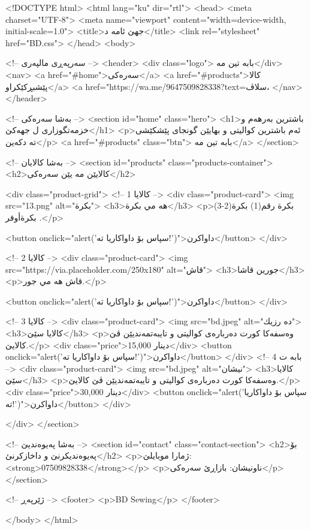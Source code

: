 <!DOCTYPE html>
<html lang="ku" dir="rtl">
<head>
    <meta charset="UTF-8">
    <meta name="viewport" content="width=device-width, initial-scale=1.0">
    <title>جهێ ئامه د</title>
    <link rel="stylesheet" href="BD.css">
</head>
<body>

    <!-- سەرپەڕی مالپەری -->
    <header>
        <div class="logo"> بابه تين مه</div>
        <nav>
            <a href="#home">سەرەکی</a>
            <a href="#products">کالا پێشبڕکێکراو</a>
        <a href="https://wa.me/9647509828338?text=سلاڤ،%
        </nav>
    </header>

    <!-- بەشا سەرەکی -->
    <section id="home" class="hero">
        <h1>باشترین بەرهەم و خزمەتگوزاری ل جهەکێ</h1>
        <p>ئەم باشترین کوالیتی و بهایێن گونجای پێشکێشی تە دکەین</p>
        <a href="#products" class="btn"> بابه تين مه</a>
    </section>

    <!-- بەشا کالایان -->
    <section id="products" class="products-container">
        <h2>کالایێن مە یێن سەرەکی</h2>
        
        <div class="product-grid">
            <!-- کالایا 1 -->
            <div class="product-card">
                <img src="13.png" alt="بكرة">
                <h3>هه مي بكرة</h3>
                <p>بكرة رقم(1) بكرة(2-3) بكرةأوفر .</p>
                
                <button onclick="alert('سپاس بۆ داواکاریا تە!')">داواکرن</button>
            </div>

            <!-- کالایا 2 -->
            <div class="product-card">
                <img src="https://via.placeholder.com/250x180" alt="قاش">
                <h3>جورين قاشا</h3>
                <p>قاش هه مي جور.</p>
                
                <button onclick="alert('سپاس بۆ داواکاریا تە!')">داواکرن</button>
            </div>

            <!-- کالایا 3 -->
            <div class="product-card">
                <img src="bd.jpeg" alt="ده رزيك">
                <h3>کالایا سێێ</h3>
                <p>وەسفەکا کورت دەربارەی کوالیتی و تایبەتمەندیێن ڤێ کالایێ.</p>
                <div class="price">15,000 دینار</div>
                <button onclick="alert('سپاس بۆ داواکاریا تە!')">داواکرن</button>
            </div>
			<!-- بابه ت 4 -->
            <div class="product-card">
                <img src="bd.jpeg" alt="نيشان">
                <h3>کالایا سێێ</h3>
                <p>وەسفەکا کورت دەربارەی کوالیتی و تایبەتمەندیێن ڤێ کالایێ.</p>
                <div class="price">30,000 دینار</div>
                <button onclick="alert('سپاس بۆ داواکاریا تە!')">داواکرن</button>
            </div>

        </div>
    </section>

    <!-- بەشا پەیوەندیێ -->
    <section id="contact" class="contact-section">
        <h2>بۆ پەیوەندیکرنێ و داخازكرنئ</h2>
        <p>ژمارا موبایلێ: <strong>07509828338</strong></p>
        <p>ناونیشان: بازاڕێ سەرەکی</p>
    </section>

    <!-- ژێرپەڕ -->
    <footer>
        <p>BD Sewing</p>
    </footer>

</body>
</html>